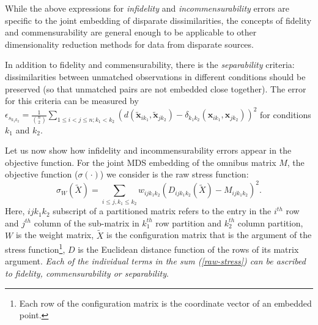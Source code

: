 \documentclass[12pt]{article} %
\begin{document}
While  the above expressions for  \emph{infidelity} and  \emph{incommensurability} errors  are specific to the joint embedding of disparate dissimilarities, the concepts of fidelity and commensurability are  general enough to be applicable to other dimensionality reduction methods for data from disparate sources. 

 In addition to fidelity and commensurability, there is the \emph{separability} criteria:  dissimilarities between unmatched  observations in different conditions  should be preserved (so that unmatched pairs are not embedded close together).  The error for this criteria can be measured by  $\epsilon_{s_{k_1k_2}} = \frac{1}{{{n}\choose{2}}} \sum_{1 \leq i < j \leq n;k_1 <k_2} (d(\widetilde{\bm{x}}_{ik_1},\widetilde{\bm{x}}_{jk_2})-{ \delta_{k_1k_2}}(\bm{x}_{ik_1},\bm{x}_{jk_2}))^2$ for  conditions   $k_1$ and  $k_2$.

Let us now show how infidelity and incommensurability errors  appear in the objective function. For the joint MDS embedding of the omnibus matrix $M$, the objective function ($\sigma(\cdot)$) we consider is the raw stress function:
\begin{equation}
\sigma_{W}(\widetilde{X})=\sum_{i\leq j,k_1\leq k_2} {w_{ijk_1k_2}(D_{ijk_1k_2}(\widetilde{X})-M_{ijk_1k_2})^2  }\label{raw-stress}.
\end{equation}
 Here, $ijk_1k_2$ subscript of a partitioned matrix refers to the entry in the $i^{th}$ row and $j^{th}$ column of the sub-matrix in $k_1^{th}$ row partition and $k_2^{th}$ column partition, $W$ is the weight matrix, $\widetilde{X}$ is the configuration matrix that is the argument of the stress function\footnote{Each row of the configuration matrix is the coordinate vector of an embedded point.}, $D$ is the Euclidean distance function of the rows of its matrix argument.  \emph{Each of the individual terms in the sum \textrm{(\ref{raw-stress})} can be ascribed to fidelity, commensurability or separability}. %
\end{document}
